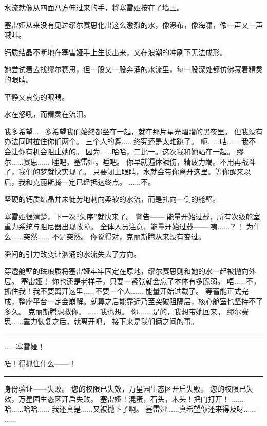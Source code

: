 \documentclass[openany]{book}
\begin{document}
水流就像从四面八方伸过来的手，将塞雷娅按在了墙上。\par
塞雷娅从来没有见过缪尔赛思化出这么激烈的水，像瀑布，像海啸，像一声又一声喊叫。\par
钙质结晶不断地在塞雷娅手上生长出来，又在浪潮的冲刷下无法成形。\par
她尝试着去找缪尔赛思，但一股又一股奔涌的水流里，每一股深处都仿佛藏着精灵的眼睛。\par
平静又哀伤的眼睛。\par
水在怒吼，而精灵在流泪。

\begin{dialogue}
     我多希望......多希望我们始终都坐在一起，就在那片星光熠熠的黑夜里。
     但我没有办法同时拉住你们两个。
     三个人的舞......终究还是太难跳了。
     呃......咕......
     我不会让你有机会阻止她的。
     因为......哈哈，二比一。这次我和她站在一起。
     缪尔......赛思......
     睡吧，塞雷娅。睡吧。
     你早就遍体鳞伤，精疲力竭。不用再战斗了，我们的梦就快实现了。
     只要闭上眼睛，水就会带你离开这里。等你醒来以后，我和克丽斯腾一定已经抵达终点。
     ......不。\par
    坚硬的钙质结晶并未徒劳地刺向柔软的水流，而是扎向一侧的舱壁。\par
    塞雷娅很清楚，下一次“失序”就快来了。
     警告——
     能量开始过载，所有次级舱室重力系统与阻尼器出现故障。
     全体人员注意，能量开始过载——
     咦......？！
     为什么......突然......
     不是突然。
     你说得对，克丽斯腾从来没有变过。\par
    瞬间的引力改变让汹涌的水流失去了方向。\par
    穿透舱壁的珐琅质将塞雷娅牢牢固定在原地，缪尔赛思则和她的水一起被抛向外层。
     塞雷娅！
     你也还是老样子，只要一紧张就会忘了本体有多脆弱。
     唔......不，抓住我！我不要离开这里......不要一个人......
     能量开始过载了。
     等蓄能正式完成，整座平台一定会崩解。就算之后能靠近乃至突破阻隔层，核心舱室也坚持不了多久。
     克丽斯腾想救你。
     ......我也想。
     你......
     是的，我想带她回来。
     缪尔赛思......重力恢复之后，就离开吧。
     接下来是我们俩之间的事。
    \par\noindent\rule{\textwidth}{0.4pt}
     ......塞雷娅！\par
     唔！得抓住什么——！
    \par\noindent\rule{\textwidth}{0.4pt}
     身份验证——失败。
     您的权限已失效，万星园生态区开启失败。
     您的权限已失效，万星园生态区开启失败。
     塞雷娅！混蛋，石头，木头！把门打开！
     ......
     哈......哈哈......
     我还真是......又被抛下了啊。
     塞雷娅......真希望你还来得及呀......
     ......
\end{dialogue}\par
\end{document}
